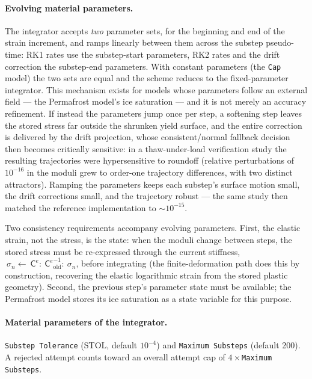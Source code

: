 \documentclass[12pt]{article}
\newcommand{\stress}{~\sigma}
\newcommand{\Celast}{{~{\mathsf C}^e}}
\begin{document}
\paragraph{Evolving material parameters.}
The integrator accepts \emph{two} parameter sets, for the beginning and
end of the strain increment, and ramps linearly between them across the
substep pseudo-time: RK1 rates use the substep-start parameters, RK2
rates and the drift correction the substep-end parameters. With
constant parameters (the \texttt{Cap} model) the two sets are equal and
the scheme reduces to the fixed-parameter integrator. This mechanism
exists for models whose parameters follow an external field --- the
Permafrost model's ice saturation --- and it is not merely an accuracy
refinement. If instead the parameters jump once per step, a softening
step leaves the stored stress far outside the shrunken yield surface,
and the entire correction is delivered by the drift projection, whose
consistent/normal fallback decision then becomes critically sensitive: in a
thaw-under-load verification study the resulting trajectories were
hypersensitive to roundoff (relative perturbations of $10^{-16}$ in the
moduli grew to order-one trajectory differences, with two distinct
attractors). Ramping the parameters keeps each substep's surface motion
small, the drift corrections small, and the trajectory robust --- the
same study then matched the reference implementation to
$\sim 10^{-15}$.

Two consistency requirements accompany evolving parameters. First, the
elastic strain, not the stress, is the state: when the moduli change
between steps, the stored stress must be re-expressed through the
current stiffness, $\stress_n \leftarrow \Celast :
\Celast_{\mathrm{old}}^{-1} : \stress_n$, before integrating (the
finite-deformation path does this by construction, recovering the
elastic logarithmic strain from the stored plastic geometry). Second,
the previous step's parameter state must be available; the Permafrost
model stores its ice saturation as a state variable for this purpose.

\paragraph{Material parameters of the integrator.}
\texttt{Substep Tolerance} (STOL, default $10^{-4}$) and
\texttt{Maximum Substeps} (default 200). A rejected attempt counts
toward an overall attempt cap of $4\times$\texttt{Maximum Substeps}.
\end{document}
